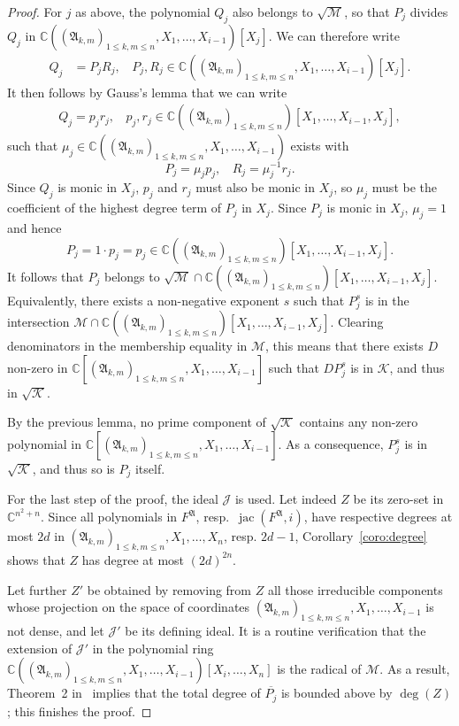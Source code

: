 \documentclass[12pt]{article}
\def\A{\mathfrak{A}}
\DeclareMathOperator{\jac}{jac}
\def\C{\mathbb{C}}
\begin{document}
\begin{proof}
  \smallskip{}  For $j$ as above, the polynomial $Q_j$
  also belongs to $\sqrt{\mathscr{M}}$, so that $P_j$ divides $Q_j$ in
  $\C((\A_{k,m})_{1 \le k,m \le n},X_1,\dots,X_{i-1})[X_j].$ We can
  therefore write
  \begin{align*}
    Q_j &= P_jR_j,~~~~ P_j,R_j \in \C((\A_{k,m})_{1 \le k,m \le n},X_1,\dots,X_{i-1})[X_j].
  \end{align*}
  It then follows by Gauss's lemma that we can write
  \begin{align*}
    Q_j = p_jr_j, ~~~~p_j,r_j \in \C((\A_{k,m})_{1 \le k,m \le n})[X_1,\dots,X_{i-1},X_j],
  \end{align*}
  such that $\mu_j \in \C((\A_{k,m})_{1 \le k,m \le n},X_1,\dots,X_{i-1})$ exists with 
  \[
  P_j = \mu_j p_j,~~~~ R_j = \mu_j^{-1}r_j.
  \]
  Since $Q_j$ is monic in $X_j$, $p_j$ and $r_j$ must also be monic in
  $X_j$, so $\mu_j$ must be the coefficient of the highest degree term
  of $P_j$ in $X_j.$ Since $P_j$ is monic in $X_j$, $\mu_j =1$ and
  hence \[P_j=1\cdot p_j=p_j \in \C((\A_{k,m})_{1 \le k,m \le
    n})[X_1,\dots,X_{i-1},X_j].\] 
  It follows that $P_j$ belongs to $\sqrt{\mathscr{M}} \cap
  \C((\A_{k,m})_{1 \le k,m \le n})[X_1,\dots,X_{i-1},X_j]$.
  Equivalently, there exists a non-negative exponent $s$ such that
  $P_j^s$ is in the intersection $\mathscr{M} \cap \C((\A_{k,m})_{1 \le k,m \le
    n})[X_1,\dots,X_{i-1},X_j]$.  Clearing denominators in the
  membership equality in $\mathscr{M}$, this means that there exists
  $D$ non-zero in $ \C[(\A_{k,m})_{1 \le k,m \le
      n},X_1,\dots,X_{i-1}]$ such that $D P_j^s$ is in $\mathscr{K}$,
  and thus in $\sqrt{\mathscr{K}}$.

  By the previous lemma, no prime component of $\sqrt{\mathscr{K}}$
  contains any non-zero polynomial in $ \C[(\A_{k,m})_{1 \le k,m \le
      n},X_1,\dots,X_{i-1}]$. As a consequence, $P_j^s$ is in
  $\sqrt{\mathscr{K}}$, and thus so is $P_j$ itself.
  
  \smallskip{}  For
  the last step of the proof, the ideal $\mathscr{J}$ is used.  Let
  indeed $Z$ be its zero-set in $\C^{n^2 + n}$. Since all polynomials in
  $F^\A$, resp.\ $\jac(F^\A, i)$, have respective degrees at most $2d$
  in $(\A_{k,m})_{1 \le k,m \le n},X_1,\dots,X_n$, resp. $2d-1$,
  Corollary~\ref{coro:degree} shows that $Z$ has degree at most
  $(2d)^{2n}$.

  Let further $Z'$ be obtained by removing from $Z$ all those
  irreducible components whose projection on the space of coordinates
  $(\A_{k,m})_{1 \le k,m \le n},X_1,\dots,X_{i-1}$ is not dense, and
  let $\mathscr{J}'$ be its defining ideal. It is a routine
  verification that the extension of $\mathscr{J}'$ in the polynomial
  ring $\C((\A_{k,m})_{1 \le k,m \le
    n},X_1,\dots,X_{i-1})[X_{i},\dots,X_n]$ is the radical of
  $\mathscr{M}$. As a result, Theorem~2 in~\cite{DaSc04} implies 
  that the total degree of $\overline{P_j}$ is bounded above by $\deg(Z)$;
  this finishes the proof.
\end{proof}
\end{document}
